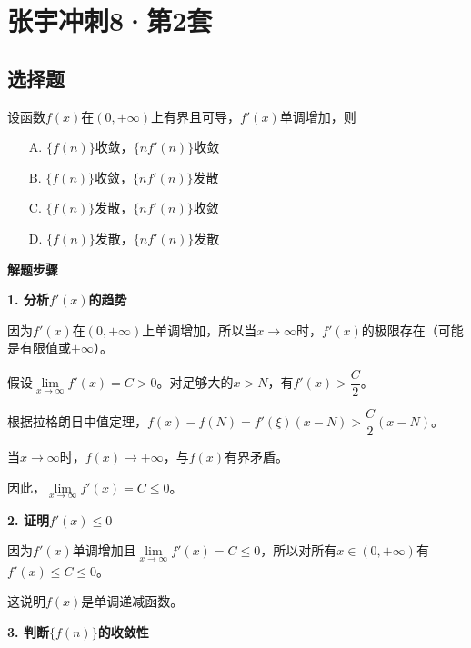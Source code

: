 \documentclass[standard]{ExBook}
\begin{document}
\newpage

\section{张宇冲刺8·第2套}
\subsection{选择题}

\begin{qitems}

    \begin{bbox}
        \qitem 设函数$f(x)$在$(0, +\infty)$上有界且可导，$f'(x)$单调增加，则
        \begin{itemize}
            \item[A.] $\{f(n)\}$收敛，$\{nf'(n)\}$收敛
            \item[B.] $\{f(n)\}$收敛，$\{nf'(n)\}$发散
            \item[C.] $\{f(n)\}$发散，$\{nf'(n)\}$收敛
            \item[D.] $\{f(n)\}$发散，$\{nf'(n)\}$发散
        \end{itemize}
        \begin{solution}
            \textbf{解题步骤}
            
            \textbf{1. 分析$f'(x)$的趋势}
            
            因为$f'(x)$在$(0, +\infty)$上单调增加，所以当$x \to \infty$时，$f'(x)$的极限存在（可能是有限值或$+\infty$）。
            
            假设$\lim\limits_{x \to \infty} f'(x) = C > 0$。对足够大的$x > N$，有$f'(x) > \dfrac{C}{2}$。
            
            根据拉格朗日中值定理，$f(x) - f(N) = f'(\xi)(x-N) > \dfrac{C}{2}(x-N)$。
            
            当$x \to \infty$时，$f(x) \to +\infty$，与$f(x)$有界矛盾。
            
            因此，$\lim\limits_{x \to \infty} f'(x) = C \le 0$。
            
            \textbf{2. 证明$f'(x) \le 0$}
            
            因为$f'(x)$单调增加且$\lim\limits_{x \to \infty} f'(x) = C \le 0$，所以对所有$x \in (0, +\infty)$有$f'(x) \le C \le 0$。
            
            这说明$f(x)$是单调递减函数。
            
            \textbf{3. 判断$\{f(n)\}$的收敛性}
            

\end{solution}
\end{bbox}
\end{qitems}
\end{document}
